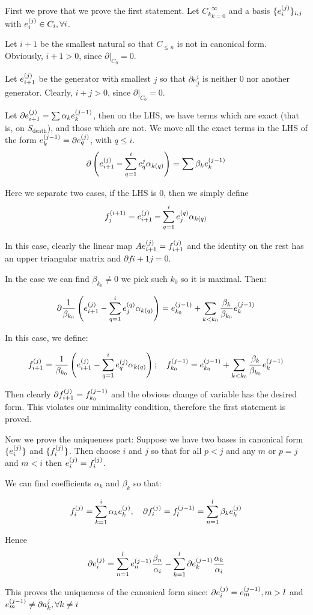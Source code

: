 \begin{prof}
First we prove that we prove the first statement. 
Let ${C_k}_{k=0}^\infty$ 
and a basis $\{e_{i}^{(j)}\}_{i,j}$ 
with $e_{i}^{(j)}\in C_i,\forall i$.

Let $i+1$ be the smallest natural so that $C_{\leq n}$
is not in canonical form. Obviously, $i+1>0$, since $\partial | _{C_0}=0$.

Let $e_{i+1}^{(j)}$ be the generator with smallest $j$ so that $\partial e^i_j$
is neither 0 nor another generator. Clearly, $i+j>0$, since $\partial | _{C_0}=0$.

Let $\partial e_{i+1}^{(j)}=\sum \alpha_k e_{k}^{(j-1)}$, then on the LHS, we have terms which are exact (that is, on $S_{\text{death}}$),
and those which are not. We move all the exact terms in the LHS of the form $e_{k}^{(j-1)}=\partial e_{q}^{(j)}$, with $q\leq i$.
$$
\partial\left(
e_{i+1}^{(j)}
-
\sum_{q=1}^i
e^j_q\alpha_{k(q)}
\right)
=
\sum \beta_k e_{k}^{(j-1)}
$$

Here we separate two cases,
if the LHS is $0$, then we simply define 
$$
f_{j}^{(i+1)}=
e_{i+1}^{(j)}
-
\sum_{q=1}^i
e_{j}^{(q)}\alpha_{k(q)}
$$

In this case, clearly the linear map $A e_{i+1}^{(j)}=f_{i+1}^{(j)}$ and the identity on the rest 
has an upper triangular matrix and $\partial f{i+1}{j}=0$.

In the case we can find $\beta_{k_0}\neq 0 $ we pick such $k_0$ so it is maximal. Then:

$$
\partial
\frac{1}{\beta_{k_0}}
\left(
e_{i+1}^{(j)}
-
\sum_{q=1}^i
e_{j}^{(q)}\alpha_{k(q)}
\right)
=
e_{k_0}^{(j-1)}
+
\sum_{k<k_0} \frac{\beta_k}{\beta_{k_0}} e_{k}^{(j-1)}
$$

In this case, we define:

$$
f_{i+1}^{(j)}
=
\frac{1}{\beta_{k_0}}
\left(
e_{i+1}^{(j)}
-
\sum_{q=1}^i
e_{q}^{(j)}\alpha_{k(q)}
\right);
\quad
f_{k_{0}}^{(j-1)}
=
e_{k_0}^{(j-1)}
+
\sum_{k<k_0} \frac{\beta_k}{\beta_{k_0}} e_{k}^{(j-1)}
$$

Then clearly $\partial f_{i+1}^{(j)}=f_{k_0}^{(j-1)}$ and the obvious change of variable has the desired form.
This violates our minimality condition, therefore the first statement is proved.

Now we prove the uniqueness part: Suppose we have two bases in canonical form
$\{e_{i}^{(j)}\}$ and $\{f_{i}^{(j)}\}$. Then choose $i$ and $j$ so that for all $p<j$ and any $m$
or $p=j$ and $m<i$ then $e_{i}^{(j)}=f_{i}^{(j)}$. 

We can find coefficients $\alpha_k$ and $\beta_k$ so that:

$$
f_{i}^{(j)}
=
\sum_{k=1}^i \alpha_k e_{k}^{(j)},
\quad
\partial f_{i}^{(j)} = f_{l}^{(j-1)}
=
\sum_{n=1}^l \beta_k e_{k}^{(j)}
$$

Hence 
$$
\partial e_{i}^{(j)}=
\sum_{n=1}^l
e_{n}^{(j-1)}\frac{\beta_n}{\alpha_i}
-
\sum_{k=1}^l
\partial e_{k}^{(j-1)}\frac{\alpha_k}{\alpha_i}
$$

This proves the uniqueness of the canonical form since: $\partial e_{i}^{(j)}=e_{m}^{(j-1)},m>l$ and 
$e_{m}^{(j-1)}\neq \partial a_k^j, \forall k\neq i$
 
\end{prof}


